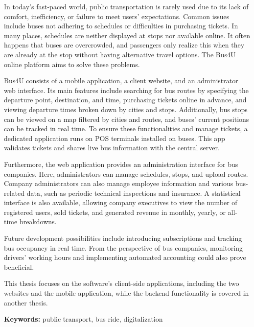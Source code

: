 In today's fast-paced world, public transportation is rarely used due to its lack of comfort, inefficiency, or failure to meet users' expectations. Common issues include buses not adhering to schedules or difficulties in purchasing tickets. In many places, schedules are neither displayed at stops nor available online. It often happens that buses are overcrowded, and passengers only realize this when they are already at the stop without having alternative travel options. The Bus4U online platform aims to solve these problems.

Bus4U consists of a mobile application, a client website, and an administrator web interface. Its main features include searching for bus routes by specifying the departure point, destination, and time, purchasing tickets online in advance, and viewing departure times broken down by cities and stops. Additionally, bus stops can be viewed on a map filtered by cities and routes, and buses' current positions can be tracked in real time. To ensure these functionalities and manage tickets, a dedicated application runs on POS terminals installed on buses. This app validates tickets and shares live bus information with the central server.

Furthermore, the web application provides an administration interface for bus companies. Here, administrators can manage schedules, stops, and upload routes. Company administrators can also manage employee information and various bus-related data, such as periodic technical inspections and insurance. A statistical interface is also available, allowing company executives to view the number of registered users, sold tickets, and generated revenue in monthly, yearly, or all-time breakdowns.

Future development possibilities include introducing subscriptions and tracking bus occupancy in real time. From the perspective of bus companies, monitoring drivers' working hours and implementing automated accounting could also prove beneficial.

This thesis focuses on the software's client-side applications, including the two websites and the mobile application, while the backend functionality is covered in another thesis.

\textbf{Keywords:} public transport, bus ride, digitalization